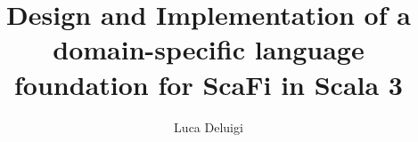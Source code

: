 \title[ScaFi-XC]{Design and Implementation of a domain-specific language foundation for ScaFi in Scala 3}
\author{Luca Deluigi}
\date{}